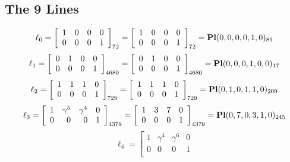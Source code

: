 \documentclass{article}
\begin{document}
{\subsection*{The 9 Lines}
$$
\ell_{0} = 
\left[
\begin{array}{*{4}{r}}
1 & 0 & 0 & 0\\
0 & 0 & 0 & 1\\
\end{array}
\right]
_{72}
=
\left[
\begin{array}{*{4}c}
1  & 0  & 0  & 0\\
0  & 0  & 0  & 1\\
\end{array}
\right]_{72}
={\rm\bf Pl}(0,0,0,0,1,0 )_{81}$$
$$
\ell_{1} = 
\left[
\begin{array}{*{4}{r}}
0 & 1 & 0 & 0\\
0 & 0 & 0 & 1\\
\end{array}
\right]
_{4680}
=
\left[
\begin{array}{*{4}c}
0  & 1  & 0  & 0\\
0  & 0  & 0  & 1\\
\end{array}
\right]_{4680}
={\rm\bf Pl}(0,0,0,1,0,0 )_{17}$$
$$
\ell_{2} = 
\left[
\begin{array}{*{4}{r}}
1 & 1 & 1 & 0\\
0 & 0 & 0 & 1\\
\end{array}
\right]
_{729}
=
\left[
\begin{array}{*{4}c}
1  & 1  & 1  & 0\\
0  & 0  & 0  & 1\\
\end{array}
\right]_{729}
={\rm\bf Pl}(0,1,0,1,1,0 )_{209}$$
$$
\ell_{3} = 
\left[
\begin{array}{*{4}{r}}
1 & \gamma^{5} & \gamma^{4} & 0\\
0 & 0 & 0 & 1\\
\end{array}
\right]
_{4379}
=
\left[
\begin{array}{*{4}c}
1  & 3  & 7  & 0\\
0  & 0  & 0  & 1\\
\end{array}
\right]_{4379}
={\rm\bf Pl}(0,7,0,3,1,0 )_{245}$$
$$
\ell_{4} = 
\left[
\begin{array}{*{4}{r}}
1 & \gamma^{4} & \gamma^{6} & 0\\
0 & 0 & 0 & 1\\

\end{array}$$}
\end{document}
